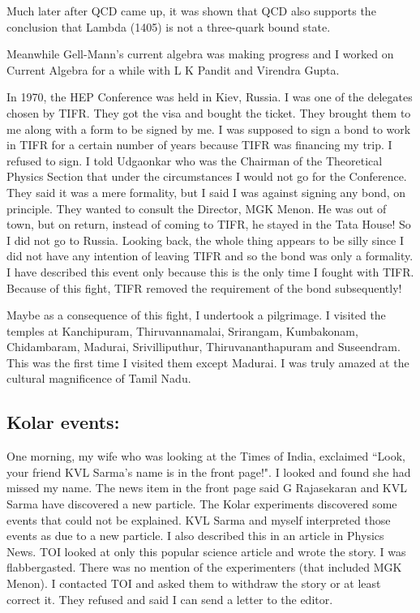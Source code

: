 Much later after QCD came up, it was shown that QCD also supports the 
conclusion that Lambda (1405) is not a three-quark bound state.

Meanwhile Gell-Mann's current algebra was making prog\-ress and I worked 
on Current Algebra for a while with L K Pandit and Virendra Gupta.

In 1970, the HEP Conference was held in Kiev, Russia. I was one of the 
delegates chosen by TIFR. They got the visa and bought the ticket. They 
brought them to me along with a form to be signed by me. I was supposed 
to sign a bond to work in TIFR for a certain number of years because 
TIFR was financing my trip. I refused to sign. I told Udgaonkar who was 
the Chairman of the Theoretical Physics Section that under the 
circumstances I would not go for the Conference. They said it was a mere 
forma\-lity, but I said I was against signing any bond, on principle. They 
wanted to consult the Director, MGK Menon. He was out of town, but on 
return, instead of coming to TIFR, he stayed in the Tata House! So I did 
not go to Russia. Looking back, the whole thing appears to be silly 
since I did not have any intention of leaving TIFR and so the bond was 
only a formality. I have described this event only because this is the 
only time I fought with TIFR. Because of this fight, TIFR removed the 
requirement of the bond subsequently!
\smallskip

Maybe as a consequence of this fight, I undertook a pilg\-rimage. I 
visited the temples at Kanchipuram, Thiruvannamalai, Srirangam, 
Kumbakonam, Chidambaram, Madurai, Srivilliput\-hur, Thiruvananthapuram and 
Suseendram. This was the first time I visited them except Madurai. I was 
truly amazed at the cultural magnificence of Tamil Nadu.

\subsection*{Kolar events:}

One morning, my wife who was looking at the Times of India, exclaimed 
``Look, your friend KVL Sarma's name is in the front page!". I looked and 
found she had missed my name. The news item in the front page said G 
Rajasekaran and KVL Sarma have discovered a new particle. The Kolar 
experiments discovered some events that could not be explained. KVL 
Sarma and myself interpreted those events as due to a new particle. I 
also described this in an article in Physics News. TOI looked at only 
this popular science article and wrote the story. I was flabbergasted. 
There was no mention of the experimenters (that included MGK Menon). I 
contacted TOI and asked them to withdraw the story or at least correct 
it. They refused and said I can send a letter to the editor.

